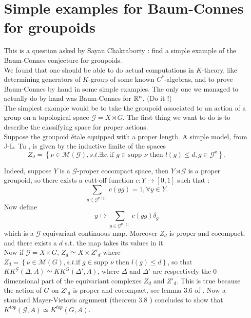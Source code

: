 \section{Simple examples for Baum-Connes for groupoids}

This is a question asked by Sayan Chakraborty : find a simple example of the Baum-Connes conjecture for groupoids. \\

We found that one should be able to do actual computations in $K$-theory, like determining generators of $K$-group of some known $C^*$-algebras, and to prove Baum-Connes by hand in some simple examples. The only one we managed to actually do by hand was Baum-Connes for $\mathbb R^n$. (Do it !) \\

The simplest example would be to take the groupoid associated to an action of a group on a topological space $\mathcal G = X\rtimes G$. The first thing we want to do is to describe the classifying space for proper actions.\\

Suppose the groupoid étale equipped with a proper length. A simple model, from J-L. Tu \cite{TuBC2}, is given by the inductive limite of the spaces
\[Z_d=\left\{\nu \in \mathcal M(\mathcal G), s.t. \exists x,\text{if } g\in \text{supp }\nu \text{ then } l(g)\leq d , g\in \mathcal G^x\right\}.\]

Indeed, suppose $Y$ is a $\mathcal G$-proper cocompact space, then $Y\rtimes \mathcal G$ is a proper groupoid, so there exists a cutt-off function $c : Y\rightarrow [0,1]$ such that : 
\[\sum_{g\in \mathcal G^{p(y)}} c(yg) = 1,\forall y \in Y.\]
Now define \[y \mapsto \sum_{g\in \mathcal G^{p(y)}} c(yg)\delta_g\]
which is a $\mathcal G$-equivariant continuous map. Moreover $Z_d$ is proper and cocompact, and there exists a $d$ s.t. the map takes its values in it.\\

Now if $\mathcal G = X\rtimes G$, $Z_d \simeq X\times Z'_d$ where $Z_d= \left\{ \nu \in \mathcal M(G), s.t. \text{if } g\in \text{supp }\nu \text{ then } l(g)\leq d\right\}$, so that
$KK^{\mathcal G}(\Delta,A)\simeq KK^G(\Delta', A)$, where $\Delta$ and $\Delta'$ are respectively the $0$-dimensional part of the equivariant complexes $Z_d$ and $Z'_d$. This is true because the action of $G$ on $Z'_d$ is proper and cocompact, see lemma $3.6$ of \cite{TuBC2}. Now a standard Mayer-Vietoris argument (theorem $3.8$ \cite{TuBC2}) concludes to show that 
$K^{top}(\mathcal G,A)\simeq K^{top}(G,A)$.\\

